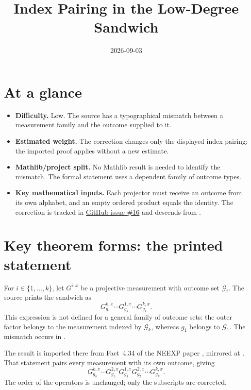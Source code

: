 \documentclass[11pt]{article}
\title{Index Pairing in the Low-Degree Sandwich}
\author{}
\date{2026-09-03}
\begin{document}
\maketitle

\section{At a glance}
\begin{itemize}
  \item \textbf{Difficulty.} Low. The source has a typographical mismatch
  between a measurement family and the outcome supplied to it.
  \item \textbf{Estimated weight.} The correction changes only the displayed
  index pairing; the imported proof applies without a new estimate.
  \item \textbf{Mathlib/project split.} No Mathlib result is needed to identify
  the mismatch. The formal statement uses a dependent family of outcome types.
  \item \textbf{Key mathematical inputs.} Each projector must receive an
  outcome from its own alphabet, and an empty ordered product equals the
  identity. The correction is tracked in
  \href{https://github.com/Dengnifer/MIPStarRE-QPBT/issues/16}{GitHub issue \#16}
  and descends from .
\end{itemize}

\section{Key theorem forms: the printed statement}
For $i\in\{1,\ldots,k\}$, let $G^{i,x}$ be a projective measurement with
outcome set $\mathcal G_i$. The source prints the sandwich as
\[
  G^{k,x}_{g_1}\cdots G^{1,x}_{g_k}\cdots G^{k,x}_{g_1}.
\]
This expression is not defined for a general family of outcome sets: the
outer factor belongs to the measurement indexed by $\mathcal G_k$, whereas
$g_1$ belongs to $\mathcal G_1$. The mismatch occurs in
\cite[lines~465--501, especially lines~484--488]{Ji2020MIPStar}.

The result is imported there from Fact~4.34 of the NEEXP paper
\cite[lines~952--973, especially lines~965--968]{Natarajan2018NEEXP}, mirrored
at . That statement
pairs every measurement with its own outcome, giving
\[
  G^{k,x}_{g_k}\cdots G^{2,x}_{g_2}G^{1,x}_{g_1}
  G^{2,x}_{g_2}\cdots G^{k,x}_{g_k}.
\]
The order of the operators is unchanged; only the subscripts are corrected.
\end{document}
